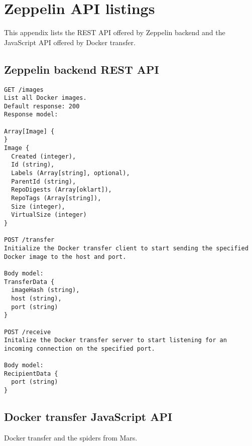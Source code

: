 \chapter{Zeppelin API listings}
\label{app:api}
This appendix lists the REST API offered by Zeppelin backend and the JavaScript API offered by Docker transfer.

\section{Zeppelin backend REST API}

\begin{lstlisting}
GET /images
List all Docker images.
Default response: 200
Response model:

Array[Image] {
}
Image {
  Created (integer),
  Id (string),
  Labels (Array[string], optional),
  ParentId (string),
  RepoDigests (Array[oklart]),
  RepoTags (Array[string]),
  Size (integer),
  VirtualSize (integer)
}

POST /transfer
Initialize the Docker transfer client to start sending the specified Docker image to the host and port.

Body model:
TransferData {
  imageHash (string),
  host (string),
  port (string)
}

POST /receive
Initalize the Docker transfer server to start listening for an incoming connection on the specified port.

Body model:
RecipientData {
  port (string)
}

\end{lstlisting}

\section{Docker transfer JavaScript API}
Docker transfer and the spiders from Mars.